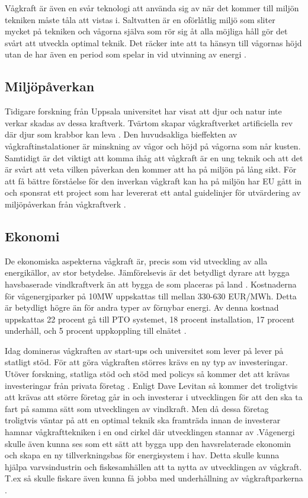 \documentclass[10pt,a4paper,oneside]{article}
\begin{document}
Vågkraft är även en svår teknologi att använda sig av när det kommer till miljön tekniken måste tåla att vistas i. Saltvatten är en oförlåtlig miljö som sliter mycket på tekniken och vågorna själva som rör sig åt alla möjliga håll gör det svårt att utveckla optimal teknik. Det räcker inte att ta hänsyn till vågornas höjd utan de har även en period som spelar in vid utvinning av energi \cite{Yale}.


\subsection{Miljöpåverkan}
Tidigare forskning från Uppsala universitet har visat att djur och natur inte verkar skadas av dessa kraftverk. Tvärtom skapar vågkraftverket artificiella rev där djur som krabbor kan leva \cite{Vattenfall}. Den huvudsakliga bieffekten av vågkraftinstalationer är minskning av vågor och höjd på vågorna som når kusten. Samtidigt är det viktigt att komma ihåg att vågkraft är en ung teknik och att det är svårt att veta vilken påverkan den kommer att ha på miljön på lång sikt. För att få bättre förståelse för den inverkan vågkraft kan ha på miljön har EU gått in och sponsrat ett project som har levererat ett antal guidelinjer för utvärdering av miljöpåverkan från vågkraftverk \cite{IRENA}. 

\subsection{Ekonomi}
De ekonomiska aspekterna vågkraft är, precis som vid utveckling av alla energikällor, av stor betydelse. Jämförelsevis är det betydligt dyrare att bygga havsbaserade vindkraftverk än att bygga de som placeras på land \cite{Yale}. 
Kostnaderna för vågenergiparker på 10MW uppskattas till mellan 330-630 EUR/MWh. Detta är betydligt högre än för andra typer av förnybar energi. Av denna kostnad uppskattas 22 procent gå till PTO systemet, 18 procent installation, 17 procent underhåll, och 5 procent uppkoppling till elnätet \cite{IRENA}.

Idag domineras vågkraften av start-ups och universitet som lever på lever på statligt stöd. För att göra vågkraften störres krävs en ny typ av investeringar. Utöver forskning, statliga stöd och stöd med policys så kommer det att krävas investeringar från privata företag \cite{IRENA}. Enligt Dave Levitan så kommer det troligtvis att krävas att större företag går in och investerar i utvecklingen för att den ska ta fart på samma sätt som utvecklingen av vindkraft. Men då dessa företag troligtvis väntar på att en optimal teknik ska framträda innan de investerar hamnar vågkrafttekniken i en ond cirkel där utvecklingen stannar av \cite{Yale}.Vågenergi skulle även kunna ses som ett sätt att bygga upp den havsrelaterade ekonomin och skapa en ny tillverkningsbas för energisystem i hav. Detta skulle kunna hjälpa varvsindustrin och fiskesamhällen att ta nytta av utvecklingen av vågkraft. T.ex så skulle fiskare även kunna få jobba med underhållning av vågkraftparkerna \cite{IRENA}. 
\end{document}
